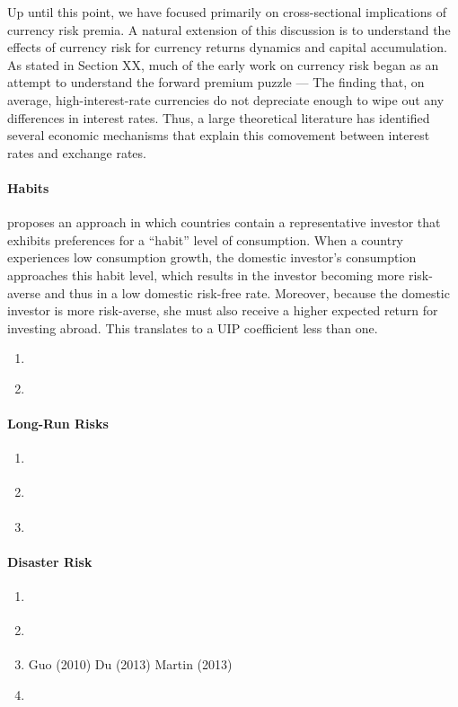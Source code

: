 \documentclass{ar-1col}
\begin{document}
Up until this point, we have focused primarily on cross-sectional 
implications of currency risk premia. A natural extension of this 
discussion is to understand the effects of currency risk for currency 
returns dynamics and capital accumulation. As stated in Section XX, 
much of the early work on currency risk began as an attempt to 
understand the forward premium puzzle --- The finding that, on 
average, high-interest-rate currencies do not depreciate enough to 
wipe out any differences in interest rates. Thus, a large theoretical 
literature has identified several economic mechanisms that explain 
this comovement between interest rates and exchange rates.

\paragraph{Habits} \citet{Verdelhan2010} proposes an approach in which 
countries contain a representative investor that exhibits preferences for 
a ``habit'' level of consumption. When a country experiences low consumption 
growth, the domestic investor's consumption approaches this habit level, which 
results in the investor becoming more risk-averse and  thus in a low domestic 
risk-free rate. Moreover, because the domestic investor is more risk-averse, she
must also receive a higher expected return for investing abroad. This translates 
to a UIP coefficient less than one.

\begin{enumerate}
    \item \citet{Heyerdahl-Larsen2011}
    \item \citet{Stathopoulos2017}
\end{enumerate}



\paragraph{Long-Run Risks}
\begin{enumerate}
    \item \citet{BansalShaliastovich2010}
    \item \citet{ColacitoCroce2011, ColacitoCroce2013}
    \item \citet{ColacitoCroceHoHoward2018}
\end{enumerate}


\paragraph{Disaster Risk}
\begin{enumerate}
    \item \citet{GourioSiemerVerdelhan2013}
    \item \citet{FarhiGabaix2016}
    \item Guo (2010) Du (2013) Martin (2013)
    \item \citet{Backusetal2001}
\end{enumerate}
\end{document}

